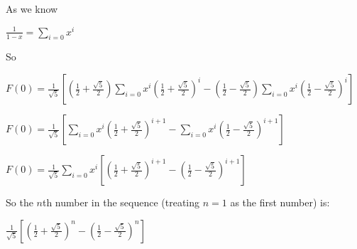 As we know

\(\frac{1}{1-x}=\sum_{i=0}x^i \)

So

\(F(0)=\frac{1}{\sqrt 5}[(\frac{1}{2}+\frac{\sqrt 5}{2})\sum_{i=0} x^i(\frac{1}{2}+\frac{\sqrt 5}{2})^i -(\frac{1}{2}-\frac{\sqrt 5}{2})\sum_{i=0}x^i(\frac{1}{2}-\frac{\sqrt 5}{2})^i]\)

\(F(0)=\frac{1}{\sqrt 5}[\sum_{i=0} x^i(\frac{1}{2}+\frac{\sqrt 5}{2})^{i+1} -\sum_{i=0}x^i(\frac{1}{2}-\frac{\sqrt 5}{2})^{i+1}]\)

\(F(0)=\frac{1}{\sqrt 5}\sum_{i=0} x^i[(\frac{1}{2}+\frac{\sqrt 5}{2})^{i+1} -(\frac{1}{2}-\frac{\sqrt 5}{2})^{i+1}]\)

So the \(n\)th number in the sequence (treating \(n=1\) as the first number) is:

\(\frac{1}{\sqrt 5}[(\frac{1}{2}+\frac{\sqrt 5}{2})^{n} -(\frac{1}{2}-\frac{\sqrt 5}{2})^{n}]\)

